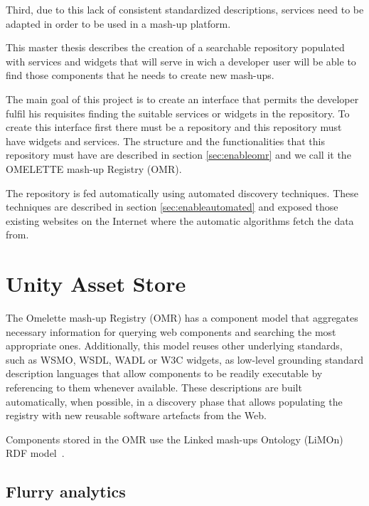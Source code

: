 Third, due to this lack of consistent standardized descriptions, services need to be adapted in order to be used in a mash-up platform. 

This master thesis describes the creation of a searchable repository populated with services and widgets that will serve in wich a developer user will be able to find those components that he needs to create new mash-ups.

The main goal of this project is to create an interface that permits the developer fulfil his requisites finding the suitable services or widgets in the repository. To create this interface first there must be a repository and this repository must have widgets and services. The structure and the functionalities that this repository must have are described in section \ref{sec:enableomr} and we call it the OMELETTE mash-up Registry (OMR).

The repository is fed automatically using automated discovery techniques. These techniques are described in section \ref{sec:enableautomated} and exposed those existing websites on the Internet where the automatic algorithms fetch the data from.

\section{Unity Asset Store}
\label{sec:assetstore}

The Omelette mash-up Registry (OMR) has a component model that aggregates necessary information for querying web components and searching the most appropriate ones. Additionally, this model reuses other underlying standards, such as WSMO, WSDL, WADL or W3C widgets, as low-level grounding standard description languages that allow components to be readily executable by referencing to them whenever available. These descriptions are built automatically, when possible, in a discovery phase that allows populating the registry with new reusable software artefacts from the Web.

Components stored in the OMR use the Linked mash-ups Ontology (LiMOn) RDF model~\cite{limon}.


\subsection{Flurry analytics}
\label{subsec:flurry}

